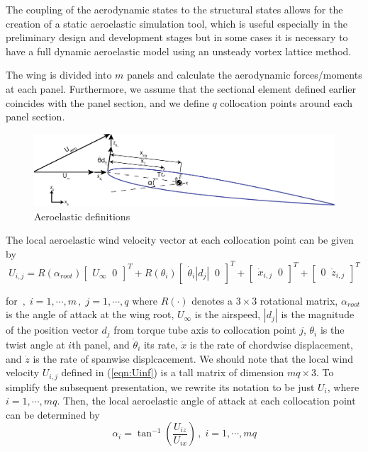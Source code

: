 \documentclass[11pt]{ucthesis}
\begin{document}
The coupling of the aerodynamic states to the structural states allows for the creation of a static aeroelastic simulation tool, which is useful especially in the preliminary design and development stages but in some cases it is necessary to have a full dynamic aeroelastic model using an unsteady vortex lattice method. 

The wing is divided into $m$ panels and calculate the aerodynamic forces/moments at each panel. Furthermore, we assume that the sectional element defined earlier coincides with the panel section, and we define $q$ collocation points around each panel section. 

\begin{figure}[thpb]
\centering
\includegraphics[width=1\linewidth]{Figures/FullAeroelasticDefinitions.png}
\caption{Aeroelastic definitions}
\label{fig:def}
\end{figure}

The local aeroelastic wind velocity vector at each collocation point can be given by
\begin{equation}
U_{i,j} = R(\alpha_{root})\begin{bmatrix}U_{\infty} \;\; 0\end{bmatrix}^T +  R(\theta_{i})\begin{bmatrix}\dot{\theta}_{i} |d_{j}| \;\; 0\end{bmatrix}^T + \begin{bmatrix}\dot{x}_{i,j}\;\; 0\end{bmatrix}^T + \begin{bmatrix}0\;\; \dot{z}_{i,j}\end{bmatrix}^T
\label{eqn:Uinf}
\end{equation}

for $ \,,\;i=1,\cdots, m\,,\;j=1,\cdots, q$ where $R(\cdot)$ denotes a $3\times 3$ rotational matrix, $\alpha_{root}$ is the angle of attack at the wing root, $U_{\infty}$ is the airspeed, $|d_{j}|$ is the magnitude of the position vector $d_{j}$ from torque tube axis to collocation point $j$, $\theta_i$ is the twist angle at $i$th panel, and $\dot{\theta}_i$ its rate, $\dot{x}$ is the rate of chordwise displacement, and $\dot{z}$ is the rate of spanwise displcacement. We should note that the local wind velocity $U_{i,j}$ defined in (\ref{eqn:Uinf}) is a tall matrix of dimension $mq \times 3$. To simplify the subsequent presentation, we rewrite its notation to be just $U_i$, where $i=1,\cdots,mq$. Then, the local aeroelastic angle of attack at each collocation point can be determined by
\begin{equation}
\alpha_{i} = \tan^{-1} \left (\frac{U_{iz}}{U_{ix}} \right) \,,\;i=1,\cdots, mq
\label{eqn:alpha_aero}
\end{equation}
\end{document}
